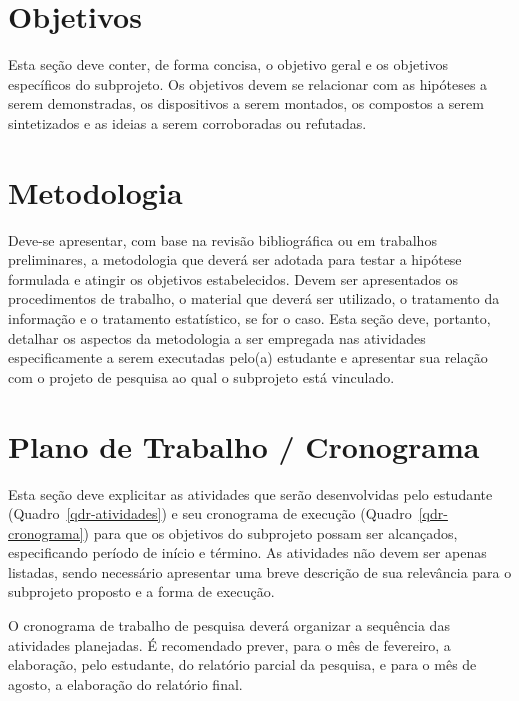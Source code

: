 \documentclass[12pt, a4paper]{article}
\begin{document}
\section{Objetivos}

Esta seção deve conter, de forma concisa, o objetivo geral e os objetivos específicos do subprojeto. Os objetivos devem se relacionar com as hipóteses a serem demonstradas, os dispositivos a serem montados, os compostos a serem sintetizados e as ideias a serem corroboradas ou refutadas. 

 

\section{Metodologia}

Deve-se apresentar, com base na revisão bibliográfica ou em trabalhos preliminares, a metodologia que deverá ser adotada para testar a hipótese formulada e atingir os objetivos estabelecidos. Devem ser apresentados os procedimentos de trabalho, o material que deverá ser utilizado, o tratamento da informação e o tratamento estatístico, se for o caso. Esta seção deve, portanto, detalhar os aspectos da metodologia a ser empregada nas atividades especificamente a serem executadas pelo(a) estudante e apresentar sua relação com o projeto de pesquisa ao qual o subprojeto está vinculado.



\section{Plano de Trabalho / Cronograma}

Esta seção deve explicitar as atividades que serão desenvolvidas pelo estudante (Quadro~\ref{qdr-atividades}) e seu cronograma de execução (Quadro~\ref{qdr-cronograma}) para que os objetivos do subprojeto possam ser alcançados, especificando período de início e término. As atividades não devem ser apenas listadas, sendo necessário apresentar uma breve descrição de sua relevância para o subprojeto proposto e a forma de execução.

O cronograma de trabalho de pesquisa deverá organizar a sequência das atividades planejadas. É recomendado prever, para o mês de fevereiro, a elaboração, pelo estudante, do relatório parcial da pesquisa, e para o mês de agosto, a elaboração do relatório final.
\end{document}
